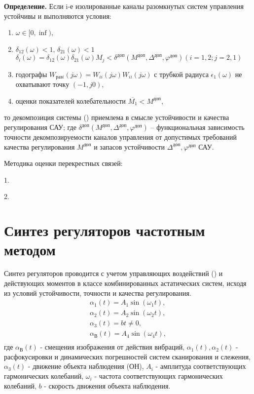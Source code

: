 \textbf{Определение.}
 Если i-е изолированные каналы разомкнутых систем управления устойчивы и выполняются условия: 
\begin{enumerate}
	\item $\omega \in [0,\inf)$,
	\item $\delta{}_{12}\left(\omega{}\right)<1$, 
	$\delta{}_{21}\left(\omega{}\right)<1$
	${\delta{}}_i(\omega{})={\delta{}}_{12}(\omega{}){\delta{}}_{21}(\omega{})M_j<\delta^{\textit{доп}}(M^{\textit{доп}}, \varDelta^{\textit{доп}}, \varphi^{\textit{доп}}) (i=1,2; j=2,1)$
	\item годографы 
	$W_{\textit{разi}}(j\omega{})=W_{ii}(j\omega{})W_{ii}(j\omega{})$ с трубкой радиуса 
	${\epsilon{}}_1\left(\omega{}\right)$ не охватывают точку $(-1,j0)$,
	\item оценки показателей колебательности $\overline{M_1}<M^{\textit{доп}}$,
\end{enumerate}
то декомпозиция системы () приемлема в смысле устойчивости и качества регулирования САУ; где
$\delta^{\textit{доп}}(M^{\textit{доп}}, \varDelta^{\textit{доп}}, \varphi^{\textit{доп}})$
 – функциональная зависимость точности декомпозируемости каналов управления от допустимых требований качества регулирования $M^{\textit{доп}}$ и запасов устойчивости $\varDelta^{\textit{доп}}, \varphi^{\textit{доп}}$ САУ. 
 
 
 Методика оценки перекрестных связей:
 
 1.
 
 2.
 
 
\section{Синтез регуляторов частотным методом} \label{sec:ch2/sec6}


Синтез регуляторов проводится с учетом управляющих воздействий () и действующих моментов в классе комбинированных астатических систем, исходя из условий устойчивости, точности и качества регулирования. 
\begin{equation}
\label{eq:p2:3-a2}
\begin{alignedat}{2}
\alpha_1(t) = A_1\sin(\omega_1t) ,\\
\alpha_2(t) = A_2\sin(\omega_2t) ,\\
\alpha_3(t) = bt \neq 0,\\
\alpha_{\textit{В}}(t) = A_4\sin(\omega_4t) ,\\
\end{alignedat}
\end{equation}
где $\alpha_{\textit{В}}(t)$ - смещения изображения от действия вибраций,
$\alpha_1(t), \alpha_2(t)$ - расфокусировки и динамических погрешностей систем сканирования и слежения,
$\alpha_3(t)$ - движение объекта наблюдения (ОН), 
$A_i$ - амплитуда соответствующих гармонических колебаний,
$\omega_i$ - частота соответствующих гармонических колебаний,
$b$ - скорость движения объекта наблюдения.

